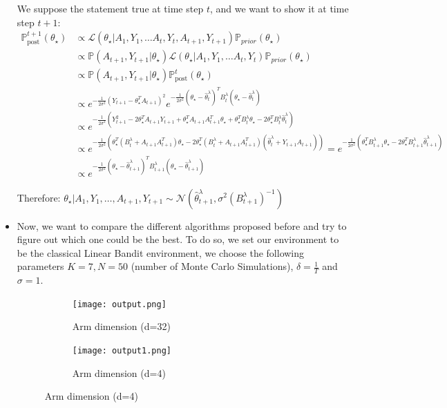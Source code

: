 \begin{itemize}
    \medskip
    We suppose the statement true at time step $t$, and we want to show it at time step $t+1$:
    \begin{align*}
        \mathbb{P}_{\text{post}}^{t+1}(\theta_{\star}) & \propto \mathcal{L}(\theta_{\star} | A_1, Y_1, \dots A_t, Y_t, A_{t+1}, Y_{t+1}) \mathbb{P}_{prior}(\theta_{\star})\\
        & \propto \mathbb{P}(A_{t+1}, Y_{t+1} | \theta_{\star}) \mathcal{L}(\theta_{\star} | A_1, Y_1, \dots A_t, Y_t) \mathbb{P}_{prior}(\theta_{\star}) \\
        & \propto \mathbb{P}(A_{t+1}, Y_{t+1} | \theta_{\star}) \mathbb{P}_{\text{post}}^{t}(\theta_{\star}) \\
        & \propto e^{-\frac{1}{2\sigma^2} (Y_{t+1} - \theta_{\star}^TA_{t+1})^2} e^{-\frac{1}{2\sigma^2}(\theta_{\star} - \hat\theta_t^{\lambda})^T B_t^{\lambda}(\theta_{\star} - \hat\theta_t^{\lambda}) }\\
        & \propto e^{-\frac{1}{2\sigma^2}(Y_{t+1}^2 -2\theta_{\star}^TA_{t+1}Y_{t+1} + \theta_{\star}^TA_{t+1}A_{t+1}^T\theta_{\star} + \theta_{\star}^T B_t^{\lambda}\theta_{\star} - 2\theta_{\star}^T B_t^{\lambda}\hat\theta_t^{\lambda})}\\
        & \propto e^{-\frac{1}{2\sigma^2}(\theta_{\star}^T (B_t^{\lambda} + A_{t+1}A_{t+1}^T) \theta_{\star} -2 \theta_{\star}^T (B_t^{\lambda} + A_{t+1}A_{t+1}^T) (\hat\theta_{t}^{\lambda} + Y_{t+1}A_{t+1})  )} = e^{-\frac{1}{2\sigma^2}(\theta_{\star}^T B_{t+1}^{\lambda}  \theta_{\star} -2 \theta_{\star}^T B_{t+1}^{\lambda} \hat\theta_{t+1}^{\lambda})}\\
        & \propto e^{-\frac{1}{2\sigma^2}{(\theta_{\star} - \hat\theta_{t+1}^{\lambda})}^T B_{t+1}^{\lambda}  (\theta_{\star} - \hat\theta_{t+1}^{\lambda})}
    \end{align*}

    Therefore:
    $\theta_{\star}|A_1, Y_1, \dots, A_{t+1}, Y_{t+1} \sim \mathcal{N}(\hat\theta_{t+1}^{\lambda}, \sigma^2{(B_{t+1}^{\lambda})}^{-1})$

    \item Now, we want to compare the different algorithms proposed before and try to figure out which one could be the best.
    To do so, we set our environment to be the classical Linear Bandit environment, we choose the following parameters $K=7, N=50$ (number of Monte Carlo Simulations), $\delta = \frac{1}{T}$ and $\sigma = 1$.

    \begin{figure}[h]
         \centering
         \begin{subfigure}[b]{0.48\textwidth}
             \centering
             \texttt{[image: output.png]}
             \caption{Arm dimension (d=32)}
         \end{subfigure}
         \hfill
         \begin{subfigure}[b]{0.48\textwidth}
             \centering
             \texttt{[image: output1.png]}
             \caption{Arm dimension (d=4)}
         \end{subfigure}
    \end{figure}


\end{itemize}
